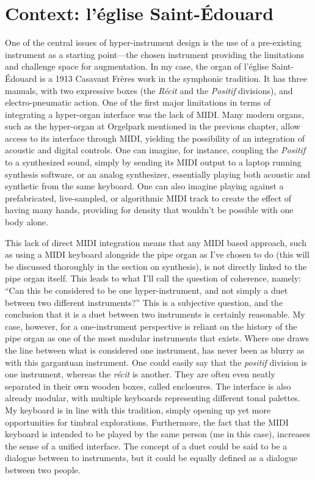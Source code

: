 \documentclass[12pt,twoside,maitrise]{dms_ks}
\theoremstyle{definition}
\begin{document}
{\section{Context: l'église Saint-Édouard}

One of the central issues of hyper-instrument design is the use of a pre-existing instrument as a starting point---the chosen instrument providing the limitations and challenge space for augmentation. 
In my case, the organ of l'église Saint-Édouard is a 1913 Casavant Frères work in the symphonic tradition. 
It has three manuals, with two expressive boxes (the \textit{Récit} and the \textit{Positif} divisions), and electro-pneumatic action. 
One of the first major limitations in terms of integrating a hyper-organ interface was the lack of MIDI. 
Many modern organs, such as the hyper-organ at Orgelpark mentioned in the previous chapter, allow access to its interface through MIDI, yielding the possibility of an integration of acoustic and digital controls. 
One can imagine, for instance, coupling the \textit{Positif} to a synthesized sound, simply by sending its MIDI output to a laptop running synthesis software, or an analog synthesizer, essentially playing both acoustic and synthetic from the same keyboard. 
One can also imagine playing against a prefabricated, live-sampled, or algorithmic MIDI track to create the effect of having many hands, providing for density that wouldn't be possible with one body alone.

This lack of direct MIDI integration means that any MIDI based approach, such as using a MIDI keyboard alongside the pipe organ as I've chosen to do (this will be discussed thoroughly in the section on synthesis), is not directly linked to the pipe organ itself.
This leads to what I'll call the question of coherence, namely: “Can this be considered to be one hyper-instrument, and not simply a duet between two different instruments?”
This is a subjective question, and the conclusion that it is a duet between two instruments is certainly reasonable.
My case, however, for a one-instrument perspective is reliant on the history of the pipe organ as one of the most modular instruments that exists.
Where one draws the line between what is considered one instrument, has never been as blurry as with this gargantuan instrument.
One could easily say that the \textit{positif} division is one instrument, whereas the \textit{récit} is another.
They are often even neatly separated in their own wooden boxes, called enclosures.
The interface is also already modular, with multiple keyboards representing different tonal palettes.
My keyboard is in line with this tradition, simply opening up yet more opportunities for timbral explorations.
Furthermore, the fact that the MIDI keyboard is intended to be played by the same person (me in this case), increases the sense of a unified interface.
The concept of a duet could be said to be a dialogue between to instruments, but it could be equally defined as a dialogue between two people.

}
\end{document}
